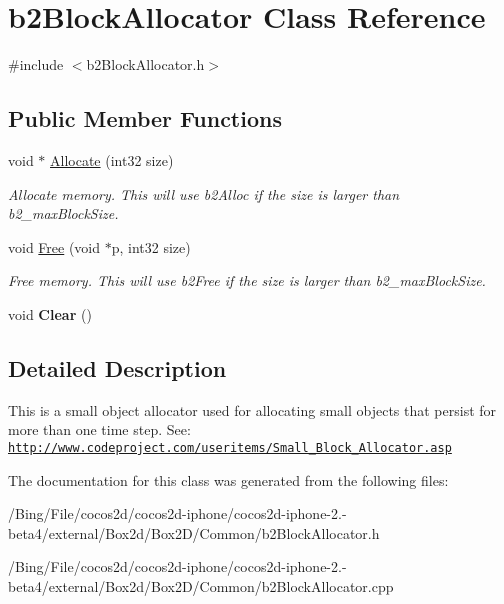 \hypertarget{classb2_block_allocator}{\section{b2\-Block\-Allocator Class Reference}
\label{classb2_block_allocator}
}


{\ttfamily \#include $<$b2\-Block\-Allocator.\-h$>$}

\subsection*{Public Member Functions}
\begin{DoxyCompactItemize}
\item 
\hypertarget{classb2_block_allocator_a437bf775c23f6e36af11a6d1653d7040}{void $\ast$ \hyperlink{classb2_block_allocator_a437bf775c23f6e36af11a6d1653d7040}{Allocate} (int32 size)}\label{classb2_block_allocator_a437bf775c23f6e36af11a6d1653d7040}

\begin{DoxyCompactList}\small\item\em Allocate memory. This will use b2\-Alloc if the size is larger than b2\-\_\-max\-Block\-Size. \end{DoxyCompactList}\item 
\hypertarget{classb2_block_allocator_a945fdf86e260318b930a53dcc887ca8b}{void \hyperlink{classb2_block_allocator_a945fdf86e260318b930a53dcc887ca8b}{Free} (void $\ast$p, int32 size)}\label{classb2_block_allocator_a945fdf86e260318b930a53dcc887ca8b}

\begin{DoxyCompactList}\small\item\em Free memory. This will use b2\-Free if the size is larger than b2\-\_\-max\-Block\-Size. \end{DoxyCompactList}\item 
\hypertarget{classb2_block_allocator_a3d3bac86217eba9d1eb6dff2acee0d77}{void {\bfseries Clear} ()}\label{classb2_block_allocator_a3d3bac86217eba9d1eb6dff2acee0d77}

\end{DoxyCompactItemize}


\subsection{Detailed Description}
This is a small object allocator used for allocating small objects that persist for more than one time step. See\-: \href{http://www.codeproject.com/useritems/Small_Block_Allocator.asp}{\tt http\-://www.\-codeproject.\-com/useritems/\-Small\-\_\-\-Block\-\_\-\-Allocator.\-asp} 

The documentation for this class was generated from the following files\-:\begin{DoxyCompactItemize}
\item 
/\-Bing/\-File/cocos2d/cocos2d-\/iphone/cocos2d-\/iphone-\/2.-\/beta4/external/\-Box2d/\-Box2\-D/\-Common/b2\-Block\-Allocator.\-h\item 
/\-Bing/\-File/cocos2d/cocos2d-\/iphone/cocos2d-\/iphone-\/2.-\/beta4/external/\-Box2d/\-Box2\-D/\-Common/b2\-Block\-Allocator.\-cpp\end{DoxyCompactItemize}
